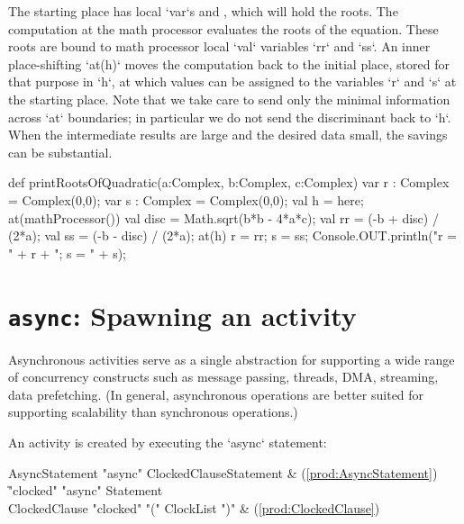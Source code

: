 The starting place has local \xcd`var`s  and , which will hold
the roots.  
The computation at the math processor evaluates the roots of the equation.
These roots are bound to math processor local \xcd`val` variables \xcd`rr` and
\xcd`ss`.  An inner place-shifting \xcd`at(h)` moves the computation back to
the initial place, stored for that purpose in \xcd`h`, at which values can be
assigned to the variables \xcd`r` 
and \xcd`s` at the starting place.  Note that we take care to send only the
minimal information across \xcd`at` boundaries; in particular we do not 
send the discriminant back to \xcd`h`.  When the intermediate results are
large and the desired data small, the savings can be substantial.

\begin{xten}
def printRootsOfQuadratic(a:Complex, b:Complex, c:Complex) {
  var r : Complex = Complex(0,0);
  var s : Complex = Complex(0,0);
  val h = here;
  at(mathProcessor()) {
    val disc = Math.sqrt(b*b - 4*a*c);
    val rr = (-b + disc) / (2*a);
    val ss = (-b - disc) / (2*a);
    at(h) {
      r = rr; s = ss;
    }
  }
  Console.OUT.println("r = " + r + "; s = " + s);
}
\end{xten}
\section{{\tt async}: Spawning an activity}\label{AsynchronousActivity}\label{AsyncActivity}

Asynchronous activities serve as a single abstraction for supporting a
wide range of concurrency constructs such as message passing, threads,
DMA, streaming, data prefetching. (In general, asynchronous operations
are better suited for supporting scalability than synchronous
operations.)

An activity is created by executing the \xcd`async` statement: 

\begin{bbgrammar}
      AsyncStatement \: \xcd"async" ClockedClause\opt Statement & (\ref{prod:AsyncStatement}) \\
                    \| \xcd"clocked" \xcd"async" Statement \\
       ClockedClause \: \xcd"clocked" \xcd"(" ClockList \xcd")" & (\ref{prod:ClockedClause}) \\
\end{bbgrammar}


